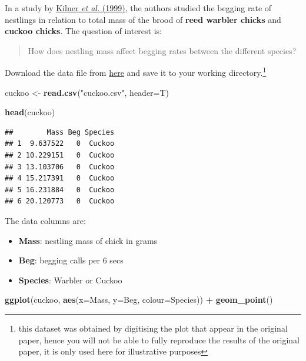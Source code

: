 \documentclass[]{book}
\newenvironment{Shaded}{\begin{snugshade}}{\end{snugshade}}
\newcommand{\KeywordTok}[1]{\textcolor[rgb]{0.13,0.29,0.53}{\textbf{#1}}}
\newcommand{\DataTypeTok}[1]{\textcolor[rgb]{0.13,0.29,0.53}{#1}}
\newcommand{\StringTok}[1]{\textcolor[rgb]{0.31,0.60,0.02}{#1}}
\newcommand{\OperatorTok}[1]{\textcolor[rgb]{0.81,0.36,0.00}{\textbf{#1}}}
\newcommand{\NormalTok}[1]{#1}
\providecommand{\tightlist}{%
  \setlength{\itemsep}{0pt}\setlength{\parskip}{0pt}}
\let\rmarkdownfootnote\footnote%
\def\footnote{\protect\rmarkdownfootnote}
\theoremstyle{definition}
\theoremstyle{definition}
\theoremstyle{definition}
\theoremstyle{remark}
\begin{document}
In a study by
\href{http://www.nature.com/nature/journal/v397/n6721/abs/397667a0.html}{Kilner
\emph{et al.} (1999)}, the authors studied the begging rate of nestlings
in relation to total mass of the brood of \textbf{reed warbler chicks}
and \textbf{cuckoo chicks}. The question of interest is:

\begin{quote}
How does nestling mass affect begging rates between the different
species?
\end{quote}

Download the data file from
\href{https://exeter-data-analytics.github.io/StatModelling/_data/cuckoo.csv}{here}
and save it to your working directory.\footnote{this dataset was
  obtained by digitising the plot that appear in the original paper,
  hence you will not be able to fully reproduce the results of the
  original paper, it is only used here for illustrative purposes}

\begin{Shaded}
\begin{Highlighting}[]
\NormalTok{cuckoo <-}\StringTok{ }\KeywordTok{read.csv}\NormalTok{(}\StringTok{"cuckoo.csv"}\NormalTok{, }\DataTypeTok{header=}\NormalTok{T)}
\end{Highlighting}
\end{Shaded}

\begin{Shaded}
\begin{Highlighting}[]
\KeywordTok{head}\NormalTok{(cuckoo)}
\end{Highlighting}
\end{Shaded}

\begin{verbatim}
##        Mass Beg Species
## 1  9.637522   0  Cuckoo
## 2 10.229151   0  Cuckoo
## 3 13.103706   0  Cuckoo
## 4 15.217391   0  Cuckoo
## 5 16.231884   0  Cuckoo
## 6 20.120773   0  Cuckoo
\end{verbatim}

The data columns are:

\begin{itemize}
\tightlist
\item
  \textbf{Mass}: nestling mass of chick in grams
\item
  \textbf{Beg}: begging calls per 6 secs
\item
  \textbf{Species}: Warbler or Cuckoo
\end{itemize}

\begin{Shaded}
\begin{Highlighting}[]
\KeywordTok{ggplot}\NormalTok{(cuckoo, }\KeywordTok{aes}\NormalTok{(}\DataTypeTok{x=}\NormalTok{Mass, }\DataTypeTok{y=}\NormalTok{Beg, }\DataTypeTok{colour=}\NormalTok{Species)) }\OperatorTok{+}\StringTok{ }\KeywordTok{geom_point}\NormalTok{()}
\end{Highlighting}
\end{Shaded}
\end{document}
